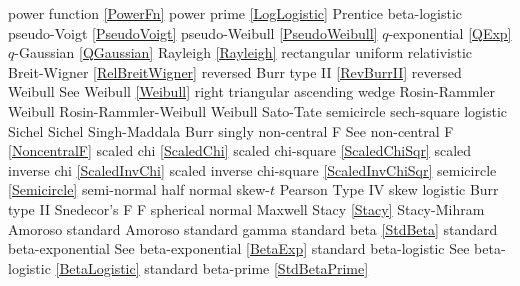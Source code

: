 power function					\dotfill	\eqref{PowerFn}					\ncite	%
power prime					\dotfill	\eqref{LogLogistic}					\mcite{\self}
Prentice 						\dotfill	beta-logistic							
pseudo-Voigt					\dotfill	\eqref{PseudoVoigt}					\ncite
pseudo-Weibull					\dotfill	\eqref{PseudoWeibull}				\ncite	%
%
$q$-exponential				\dotfill	\eqref{QExp}						\ncite	%
$q$-Gaussian					\dotfill	\eqref{QGaussian}					\ncite	%
%
Rayleigh  						\dotfill	\eqref{Rayleigh}					\ncite	%
rectangular					\dotfill	uniform 							\ncite	%
relativistic Breit-Wigner			\dotfill	\eqref{RelBreitWigner}				\ncite	%
reversed Burr type II				\dotfill	\eqref{RevBurrII} 					\ncite	%
reversed Weibull				\dotfill	See Weibull \eqref{Weibull}			\ncite	%
right triangular					\dotfill	ascending wedge 					\ncite	%
Rosin-Rammler 				\dotfill	Weibull							   		%
Rosin-Rammler-Weibull 			\dotfill	Weibull							\ncite	%
%
Sato-Tate						\dotfill	semicircle 						\ncite	%
sech-square 					\dotfill	logistic							\ncite	%
Sichel						\dotfill	Sichel							\ncite	
Singh-Maddala 					\dotfill	Burr 								\ncite	%
singly non-central F       			 \dotfill	See non-central F  \eqref{NoncentralF}	\ncite 
scaled chi						\dotfill	\eqref{ScaledChi}					\ncite	%
scaled chi-square 				\dotfill	\eqref{ScaledChiSqr}					\ncite	%
scaled inverse chi 				\dotfill	\eqref{ScaledInvChi}					\ncite	%
scaled inverse chi-square 			\dotfill	\eqref{ScaledInvChiSqr}				 	%
semicircle						\dotfill	\eqref{Semicircle}					\ncite	%
semi-normal 					\dotfill	half normal 						\ncite	%
skew-$t$						\dotfill	Pearson Type IV 					\ncite	%
skew logistic					\dotfill	Burr type II 						\ncite	%
Snedecor's F  					\dotfill	F 								\ncite	%
spherical normal				\dotfill	Maxwell							\ncite	%
Stacy 						\dotfill	\eqref{Stacy} 						\ncite	%
Stacy-Mihram					\dotfill	Amoroso							\ncite	%
standard Amoroso				\dotfill	standard gamma 					\ncite	%
standard beta					\dotfill	\eqref{StdBeta} 					\ncite	%
standard beta-exponential			\dotfill	See beta-exponential \eqref{BetaExp}	\ncite	%
standard beta-logistic			\dotfill	See beta-logistic \eqref{BetaLogistic}		\ncite	%
standard beta-prime				\dotfill	\eqref{StdBetaPrime}				\ncite	%
